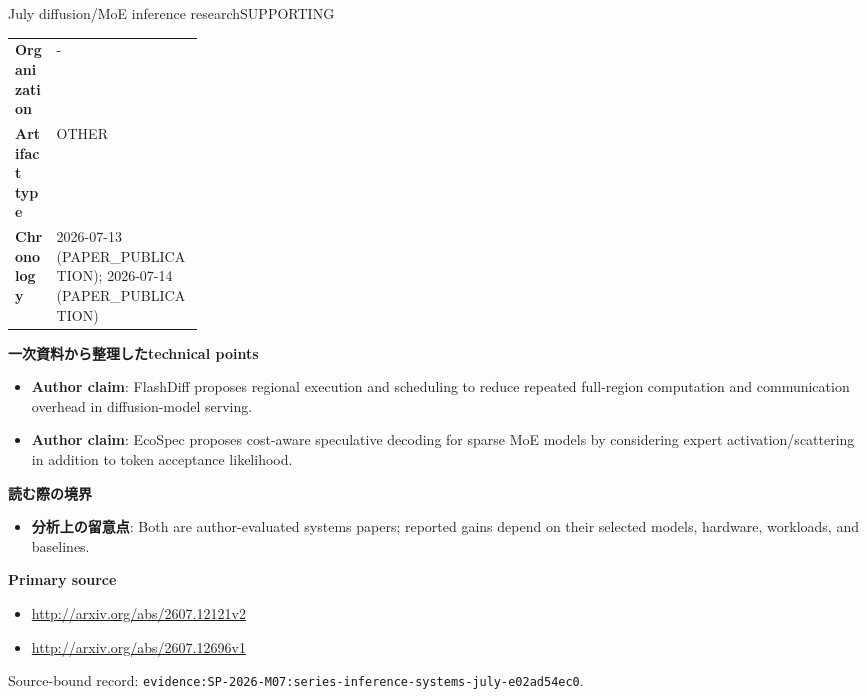\begin{technicalnote}{July diffusion/MoE inference research}{SUPPORTING}
\begin{tabularx}{\linewidth}{@{}>{\bfseries}p{0.22\linewidth}X@{}}
Organization & - \\
Artifact type & OTHER \\
Chronology & 2026-07-13 (PAPER\_PUBLICATION); 2026-07-14 (PAPER\_PUBLICATION) \\
\end{tabularx}
\smallskip
{\bfseries 一次資料から整理したtechnical points}
\begin{itemize}[leftmargin=1.5em,itemsep=0.35em]
\item \textbf{Author claim}: FlashDiff proposes regional execution and scheduling to reduce repeated full-region computation and communication overhead in diffusion-model serving.
\item \textbf{Author claim}: EcoSpec proposes cost-aware speculative decoding for sparse MoE models by considering expert activation/scattering in addition to token acceptance likelihood.
\end{itemize}
{\bfseries 読む際の境界}
\begin{itemize}[leftmargin=1.5em,itemsep=0.35em]
\item \textbf{分析上の留意点}: Both are author-evaluated systems papers; reported gains depend on their selected models, hardware, workloads, and baselines.
\end{itemize}
{\bfseries Primary source}
\begin{itemize}[leftmargin=1.5em,itemsep=0.25em]
\item \url{http://arxiv.org/abs/2607.12121v2}
\item \url{http://arxiv.org/abs/2607.12696v1}
\end{itemize}
{\scriptsize\color{SurveyMuted}Source-bound record: \texttt{evidence:SP-2026-M07:series-inference-systems-july-e02ad54ec0}.}
\end{technicalnote}
\medskip
